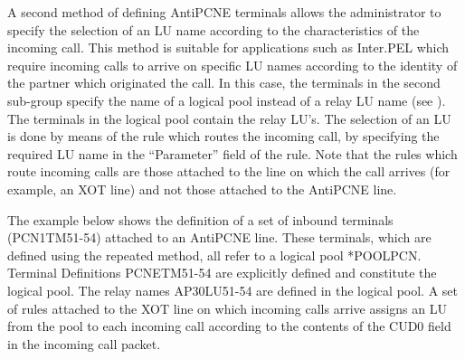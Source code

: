 \documentclass[letterpaper,10pt,english]{sphinxmanual}
\begin{document}

A second method of defining AntiPCNE terminals allows the administrator to specify the selection of an LU name according to the characteristics of the incoming call. This method is suitable for applications such as Inter.PEL which require incoming calls to arrive on specific LU names according to the identity of the partner which originated the call. In this case, the terminals in the second sub-group specify the name of a logical pool instead of a relay LU name (see {\hyperref[\detokenize{connectivity_guide:v461cn-logicalpool}]{}}). The terminals in the logical pool contain the relay LU’s. The selection of an LU is done by means of the rule which routes the incoming call, by specifying the required LU name in the “Parameter” field of the rule. Note that the rules which route incoming calls are those attached to the line on which the call arrives (for example, an XOT line) and not those attached to the AntiPCNE line.

The example below shows the definition of a set of inbound terminals (PCN1TM51-54) attached to an AntiPCNE line. These terminals, which are defined using the repeated method, all refer to a logical pool *POOLPCN. Terminal Definitions PCNETM51-54 are explicitly defined and constitute the logical pool. The relay names AP30LU51-54 are defined in the logical pool. A set of rules attached to the XOT line on which incoming calls arrive assigns an LU from the pool to each incoming call according to the contents of the CUD0 field in the incoming call packet.
\end{document}
